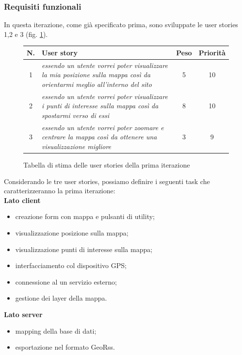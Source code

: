 \subsubsection{Requisiti funzionali}
In questa iterazione, come già specificato prima, sono sviluppate le user stories 1,2 e 3 (fig. \ref{userstoriestableprimaiterazione}). \\
\begin{figure}[h!]
\begin{center}
\begin{tabular}[c]{|c|p{10cm}|c|c|}
\hline
N. & User story & Peso & Priorità\\
\hline
1 & \textit{essendo un utente vorrei poter visualizzare la mia posizione sulla mappa così da orientarmi meglio all'interno del sito} & 5 & 10\\
\hline
2 & \textit{essendo un utente vorrei poter visualizzare i punti di interesse sulla mappa così da spostarmi verso di essi} & 8 & 10\\
\hline
3 & \textit{essendo un utente vorrei poter zoomare e centrare la mappa così da ottenere una visualizzazione migliore} & 3 & 9\\
\hline
\end{tabular}
\caption{Tabella di stima delle user stories della prima iterazione\label{userstoriestableprimaiterazione}}
\end{center}
\end{figure}
\clearpage

Considerando le tre user stories, possiamo definire i seguenti task che caratterizzeranno la prima iterazione:\\
\textbf{Lato client}
\begin{itemize}
\item creazione form con mappa e pulsanti di utility;
\item visualizzazione posizione sulla mappa;
\item visualizzazione punti di interesse sulla mappa;
\item interfacciamento col dispositivo GPS;
\item connessione al un servizio esterno;
\item gestione dei layer della mappa.
\end{itemize}

\textbf{Lato server}
\begin{itemize}
\item mapping della base di dati;
\item esportazione nel formato GeoRss.
\end{itemize}

